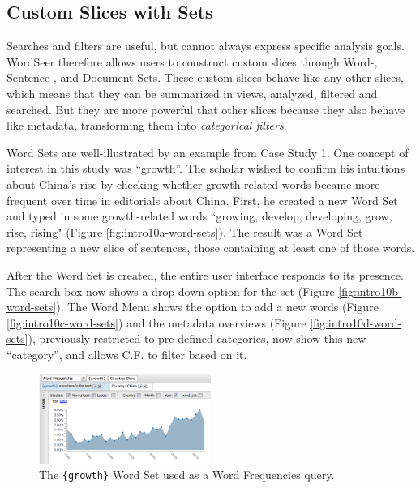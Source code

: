 \documentclass{sig-alternate}
\newcommand{\code}[1] {\texttt{#1}}
\begin{document}
\subsection{Custom Slices with Sets}

Searches and filters are useful, but cannot always express  specific analysis goals. WordSeer therefore allows users to construct custom slices through Word-, Sentence-, and Document Sets. These custom slices behave like any other slices, which means that they can be summarized in views,  analyzed, filtered and searched. But they are more powerful that other slices because they also behave like metadata, transforming them into \emph{categorical filters}.

Word Sets are well-illustrated by an example from Case Study 1.  One concept of interest in this study was ``growth''. The scholar wished to confirm his intuitions about China's rise by checking whether  growth-related words became more frequent over time in editorials about China. First, he created a new Word Set and typed in some growth-related words ``growing, develop, developing, grow, rise, rising" (Figure \ref{fig:intro10a-word-sets}). The result was a Word Set representing a new slice of sentences, those containing at least one of those words. 


After the Word Set is created, the entire user interface responds to its presence. The search box now shows a drop-down option for the set  (Figure \ref{fig:intro10b-word-sets}).  The Word Menu shows the option to add a new words (Figure \ref{fig:intro10c-word-sets}) and the metadata overviews (Figure \ref{fig:intro10d-word-sets}), previously restricted to pre-defined categories,  now show this new ``category'', and allows C.F. to filter based on it.   

\begin{figure}[ht!]
\begin{center}
	\includegraphics[width=0.5\textwidth]{fig/chris/04a.png}
\end{center}
    \caption{%
	The \code{\{growth\}} Word Set used as a Word Frequencies query.\label{fig:chris04a}
     }%
\end{figure}
\end{document}
